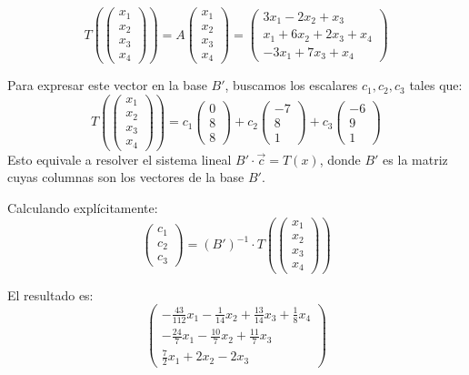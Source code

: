 \begin{prob}
\begin{myproof}
\[
T\left(\begin{pmatrix} x_1 \\ x_2 \\ x_3 \\ x_4 \end{pmatrix}\right) = A \begin{pmatrix} x_1 \\ x_2 \\ x_3 \\ x_4 \end{pmatrix}
= \begin{pmatrix}
3x_1 - 2x_2 + x_3 \\
x_1 + 6x_2 + 2x_3 + x_4 \\
-3x_1 + 7x_3 + x_4
\end{pmatrix}
\]

Para expresar este vector en la base $B'$, buscamos los escalares $c_1, c_2, c_3$ tales que:
\[
T\left(\begin{pmatrix} x_1 \\ x_2 \\ x_3 \\ x_4 \end{pmatrix}\right) = c_1 \begin{pmatrix} 0 \\ 8 \\ 8 \end{pmatrix} + c_2 \begin{pmatrix} -7 \\ 8 \\ 1 \end{pmatrix} + c_3 \begin{pmatrix} -6 \\ 9 \\ 1 \end{pmatrix}
\]
Esto equivale a resolver el sistema lineal $B' \cdot \vec{c} = T(x)$, donde $B'$ es la matriz cuyas columnas son los vectores de la base $B'$.

Calculando explícitamente:
\[
\begin{pmatrix}
c_1 \\
c_2 \\
c_3
\end{pmatrix}
=
(B')^{-1} \cdot T\left(\begin{pmatrix} x_1 \\ x_2 \\ x_3 \\ x_4 \end{pmatrix}\right)
\]

El resultado es:
\[
\begin{pmatrix}
-\frac{43}{112}x_1 - \frac{1}{14}x_2 + \frac{13}{14}x_3 + \frac{1}{8}x_4 \\
-\frac{24}{7}x_1 - \frac{10}{7}x_2 + \frac{11}{7}x_3 \\
\frac{7}{2}x_1 + 2x_2 - 2x_3
\end{pmatrix}
\]


\end{myproof}
\end{prob}

